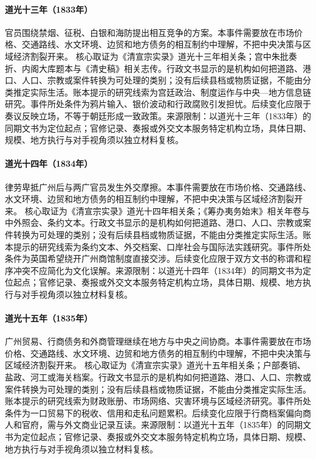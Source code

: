 \hypertarget{civic:EQ-1833-OPIUM-POLICY-DEBATE}{}\paragraph{道光十三年（1833年）}官员围绕禁烟、征税、白银和海防提出相互竞争的方案。本事件需要放在市场价格、交通路线、水文环境、边贸和地方债务的相互制约中理解，不把中央决策与区域经济割裂开来。 核心取证为《清宣宗实录》道光十三年相关条；宫中朱批奏折、内阁大库题本与《清史稿》相关志传。行政文书显示的是机构如何把道路、港口、人口、宗教或案件转换为可处理的类别；没有后续县档或物质证据，不能由分类推定实际生活。账本提示的研究线索为宫廷政治、制度运作与中央—地方信息链研究。事件所处条件为鸦片输入、银价波动和行政腐败引发担忧。后续变化应限于奏议反映立场，不等于朝廷形成一致政策。来源限制：以道光十三年（1833年）的同期文书为定位起点；官修记录、奏报或外交文本服务特定机构立场，具体日期、规模、地方执行与对手视角须以独立材料复核。
\hypertarget{civic:EQ-1834-NAPIER-AFFAIR}{}\paragraph{道光十四年（1834年）}律劳卑抵广州后与两广官员发生外交摩擦。本事件需要放在市场价格、交通路线、水文环境、边贸和地方债务的相互制约中理解，不把中央决策与区域经济割裂开来。 核心取证为《清宣宗实录》道光十四年相关条；《筹办夷务始末》相关年卷与中外照会、条约文本。行政文书显示的是机构如何把道路、港口、人口、宗教或案件转换为可处理的类别；没有后续县档或物质证据，不能由分类推定实际生活。账本提示的研究线索为条约文本、外交档案、口岸社会与国际法实践研究。事件所处条件为英国希望绕开广州商馆制度直接交涉。后续变化应限于双方文书的称谓和程序冲突不应简化为文化误解。来源限制：以道光十四年（1834年）的同期文书为定位起点；官修记录、奏报或外交文本服务特定机构立场，具体日期、规模、地方执行与对手视角须以独立材料复核。
\hypertarget{civic:EQ-1835-GUANGZHOU-TRADE-REGULATION}{}\paragraph{道光十五年（1835年）}广州贸易、行商债务和外商管理继续在地方与中央之间协商。本事件需要放在市场价格、交通路线、水文环境、边贸和地方债务的相互制约中理解，不把中央决策与区域经济割裂开来。 核心取证为《清宣宗实录》道光十五年相关条；户部奏销、盐政、河工或海关档案。行政文书显示的是机构如何把道路、港口、人口、宗教或案件转换为可处理的类别；没有后续县档或物质证据，不能由分类推定实际生活。账本提示的研究线索为财政账册、市场网络、灾害环境与区域经济研究。事件所处条件为一口贸易下的税收、信用和走私问题累积。后续变化应限于行商档案偏向商人和官府，需与外文商业记录互读。来源限制：以道光十五年（1835年）的同期文书为定位起点；官修记录、奏报或外交文本服务特定机构立场，具体日期、规模、地方执行与对手视角须以独立材料复核。
